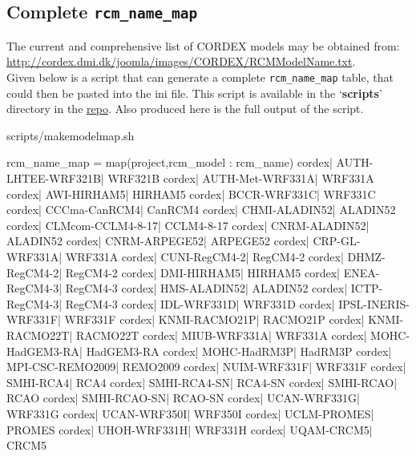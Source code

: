 \subsection{Complete \texttt{rcm\_name\_map}}
The current and comprehensive list of CORDEX models may be obtained from:\\
\url{http://cordex.dmi.dk/joomla/images/CORDEX/RCMModelName.txt}. \\
Given below is a script that can generate a complete \texttt{rcm\_name\_map} table, that could then be pasted into the ini file. This script is available in the `\textbf{scripts}' directory in the \href{https://github.com/snic-nsc/datanode-mgr-doc.git}{repo}. Also produced here is the full output of the script. 
\begin{tiny}
\begin{verbatimtabinput}[4]{scripts/makemodelmap.sh}
\end{verbatimtabinput}
\vspace{-8mm}
\begin{verbatimtab}[4]
rcm_name_map = map(project,rcm_model : rcm_name)
        cordex| AUTH-LHTEE-WRF321B| WRF321B
        cordex| AUTH-Met-WRF331A| WRF331A
        cordex| AWI-HIRHAM5| HIRHAM5
        cordex| BCCR-WRF331C| WRF331C
        cordex| CCCma-CanRCM4| CanRCM4
        cordex| CHMI-ALADIN52| ALADIN52
        cordex| CLMcom-CCLM4-8-17| CCLM4-8-17
        cordex| CNRM-ALADIN52| ALADIN52
        cordex| CNRM-ARPEGE52| ARPEGE52
        cordex| CRP-GL-WRF331A| WRF331A
        cordex| CUNI-RegCM4-2| RegCM4-2
        cordex| DHMZ-RegCM4-2| RegCM4-2
        cordex| DMI-HIRHAM5| HIRHAM5
        cordex| ENEA-RegCM4-3| RegCM4-3
        cordex| HMS-ALADIN52| ALADIN52
        cordex| ICTP-RegCM4-3| RegCM4-3
        cordex| IDL-WRF331D| WRF331D
        cordex| IPSL-INERIS-WRF331F| WRF331F
        cordex| KNMI-RACMO21P| RACMO21P
        cordex| KNMI-RACMO22T| RACMO22T
        cordex| MIUB-WRF331A| WRF331A
        cordex| MOHC-HadGEM3-RA| HadGEM3-RA
        cordex| MOHC-HadRM3P| HadRM3P
        cordex| MPI-CSC-REMO2009| REMO2009
        cordex| NUIM-WRF331F| WRF331F
        cordex| SMHI-RCA4| RCA4
        cordex| SMHI-RCA4-SN| RCA4-SN
        cordex| SMHI-RCAO| RCAO
        cordex| SMHI-RCAO-SN| RCAO-SN
        cordex| UCAN-WRF331G| WRF331G
        cordex| UCAN-WRF350I| WRF350I
        cordex| UCLM-PROMES| PROMES
        cordex| UHOH-WRF331H| WRF331H
        cordex| UQAM-CRCM5| CRCM5
\end{verbatimtab}
\end{tiny}

